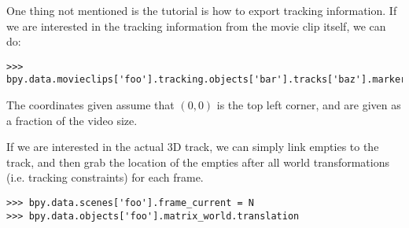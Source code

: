 One thing not mentioned is the tutorial is how to export tracking information. If we are interested in the tracking information from the movie clip itself, we can do:

\begin{lstlisting}
>>> bpy.data.movieclips['foo'].tracking.objects['bar'].tracks['baz'].markers.find_frame(N).co.xy
\end{lstlisting}

The coordinates given assume that $(0, 0)$ is the top left corner, and are given as a fraction of the video size.

If we are interested in the actual 3D track, we can simply link empties to the track, and then grab the location of the empties after all world transformations (i.e. tracking constraints) for each frame.

\begin{lstlisting}
>>> bpy.data.scenes['foo'].frame_current = N
>>> bpy.data.objects['foo'].matrix_world.translation
\end{lstlisting}
